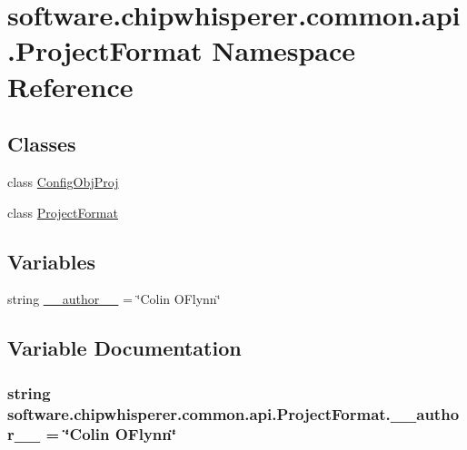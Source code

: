 \hypertarget{namespacesoftware_1_1chipwhisperer_1_1common_1_1api_1_1ProjectFormat}{}\section{software.\+chipwhisperer.\+common.\+api.\+Project\+Format Namespace Reference}
\label{namespacesoftware_1_1chipwhisperer_1_1common_1_1api_1_1ProjectFormat}
\subsection*{Classes}
\begin{DoxyCompactItemize}
\item 
class \hyperlink{classsoftware_1_1chipwhisperer_1_1common_1_1api_1_1ProjectFormat_1_1ConfigObjProj}{Config\+Obj\+Proj}
\item 
class \hyperlink{classsoftware_1_1chipwhisperer_1_1common_1_1api_1_1ProjectFormat_1_1ProjectFormat}{Project\+Format}
\end{DoxyCompactItemize}
\subsection*{Variables}
\begin{DoxyCompactItemize}
\item 
string \hyperlink{namespacesoftware_1_1chipwhisperer_1_1common_1_1api_1_1ProjectFormat_a6f0470884ce2814e0d2eaca6d76792b5}{\+\_\+\+\_\+author\+\_\+\+\_\+} = \char`\"{}Colin O\textquotesingle{}Flynn\char`\"{}
\end{DoxyCompactItemize}


\subsection{Variable Documentation}
\hypertarget{namespacesoftware_1_1chipwhisperer_1_1common_1_1api_1_1ProjectFormat_a6f0470884ce2814e0d2eaca6d76792b5}{}
\subsubsection[{\+\_\+\+\_\+author\+\_\+\+\_\+}]{\setlength{\rightskip}{0pt plus 5cm}string software.\+chipwhisperer.\+common.\+api.\+Project\+Format.\+\_\+\+\_\+author\+\_\+\+\_\+ = \char`\"{}Colin O\textquotesingle{}Flynn\char`\"{}}\label{namespacesoftware_1_1chipwhisperer_1_1common_1_1api_1_1ProjectFormat_a6f0470884ce2814e0d2eaca6d76792b5}
